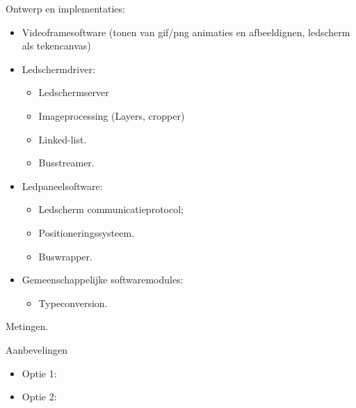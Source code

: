 \begin{frame}
	Ontwerp en implementaties:
	\begin{itemize}
		\item Videoframesoftware (tonen van gif/png animaties en afbeeldignen, ledscherm als tekencanvas)
		\item Ledschermdriver:
			\begin{itemize}
				\item Ledschermserver
				\item Imageprocessing (Layers, cropper)
				\item Linked-list.
				\item Busstreamer.
			\end{itemize}
		\item Ledpaneelsoftware:
			\begin{itemize}
				\item Ledscherm communicatieprotocol;
				\item Positioneringssysteem.
				\item Buswrapper.
			\end{itemize}
		\item Gemeenschappelijke softwaremodules:
			\begin{itemize}
				\item Typeconversion.
			\end{itemize}
	\end{itemize}
	Metingen.
\end{frame}

\begin{frame}{Aanbevelingen}
	\begin{itemize}
		\item Optie 1:
		\item Optie 2:
	\end{itemize}	
\end{frame}